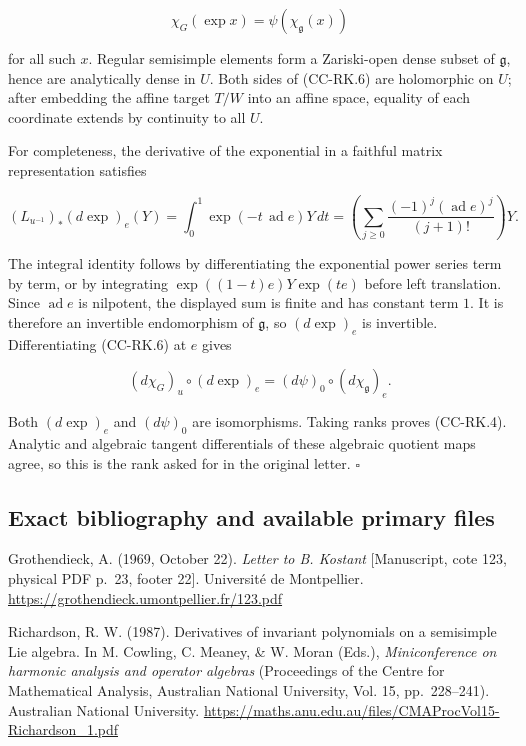 \[
 \chi_G(\exp x)=\psi(\chi_{\mathfrak g}(x))
 \tag{CC-RK.6}
\]

for all such \(x\). Regular semisimple elements form a Zariski-open dense subset of \(\mathfrak g\), hence are analytically dense in \(U\). Both sides of (CC-RK.6) are holomorphic on \(U\); after embedding the affine target \(T/W\) into an affine space, equality of each coordinate extends by continuity to all \(U\).

For completeness, the derivative of the exponential in a faithful matrix representation satisfies

\[
 (L_{u^{-1}})_*(d\exp)_e(Y)
   =\int_0^1 \exp(-t\,\operatorname{ad}e)Y\,dt
   =\left(\sum_{j\geq0}
       \frac{(-1)^j(\operatorname{ad}e)^j}{(j+1)!}\right)Y.
 \tag{CC-RK.7}
\]

The integral identity follows by differentiating the exponential power series term by term, or by integrating
\(\exp((1-t)e)Y\exp(te)\) before left translation. Since \(\operatorname{ad}e\) is nilpotent, the displayed sum is finite and has constant term \(1\). It is therefore an invertible endomorphism of \(\mathfrak g\), so \((d\exp)_e\) is invertible. Differentiating (CC-RK.6) at \(e\) gives

\[
 (d\chi_G)_u\circ(d\exp)_e
       =(d\psi)_0\circ(d\chi_{\mathfrak g})_e.
\]

Both \((d\exp)_e\) and \((d\psi)_0\) are isomorphisms. Taking ranks proves (CC-RK.4). Analytic and algebraic tangent differentials of these algebraic quotient maps agree, so this is the rank asked for in the original letter. \(\square\)

\subsection{Exact bibliography and available primary files}\label{cc-rk-bibliography}

Grothendieck, A. (1969, October 22). \emph{Letter to B. Kostant} {[}Manuscript, cote 123, physical PDF p.~23, footer 22{]}. Université de Montpellier. \url{https://grothendieck.umontpellier.fr/123.pdf}

Richardson, R. W. (1987). Derivatives of invariant polynomials on a semisimple Lie algebra. In M. Cowling, C. Meaney, \& W. Moran (Eds.), \emph{Miniconference on harmonic analysis and operator algebras} (Proceedings of the Centre for Mathematical Analysis, Australian National University, Vol. 15, pp.~228--241). Australian National University. \url{https://maths.anu.edu.au/files/CMAProcVol15-Richardson_1.pdf}

